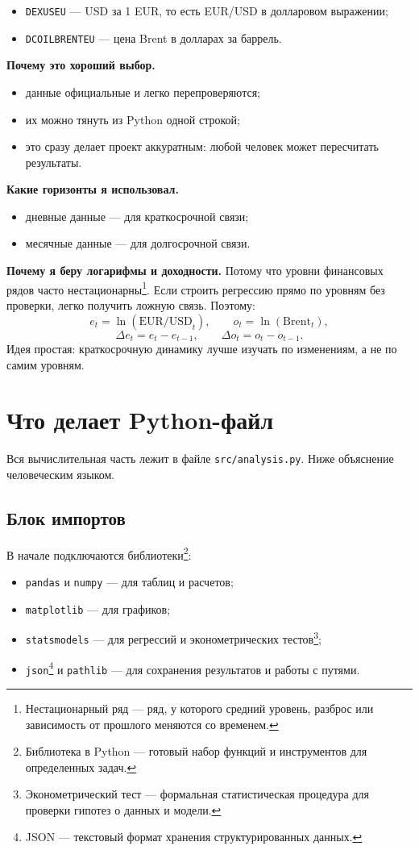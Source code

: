 \documentclass[a4paper,12pt]{article}
\begin{document}
\begin{itemize}
    \item \texttt{DEXUSEU} --- USD за 1 EUR, то есть EUR/USD в долларовом выражении;
    \item \texttt{DCOILBRENTEU} --- цена Brent в долларах за баррель.
\end{itemize}

\textbf{Почему это хороший выбор.}
\begin{itemize}
    \item данные официальные и легко перепроверяются;
    \item их можно тянуть из Python одной строкой;
    \item это сразу делает проект аккуратным: любой человек может пересчитать результаты.
\end{itemize}

\textbf{Какие горизонты я использовал.}
\begin{itemize}
    \item дневные данные --- для краткосрочной связи;
    \item месячные данные --- для долгосрочной связи.
\end{itemize}

\textbf{Почему я беру логарифмы и доходности.}
Потому что уровни финансовых рядов часто нестационарны\footnote{Нестационарный ряд --- ряд, у которого средний уровень, разброс или зависимость от прошлого меняются со временем.}. Если строить регрессию прямо по уровням без проверки, легко получить ложную связь. Поэтому:
\[
e_t=\ln(\text{EUR/USD}_t), \qquad o_t=\ln(\text{Brent}_t),
\]
\[
\Delta e_t=e_t-e_{t-1}, \qquad \Delta o_t=o_t-o_{t-1}.
\]
Идея простая: краткосрочную динамику лучше изучать по изменениям, а не по самим уровням.

\section{Что делает Python-файл}
Вся вычислительная часть лежит в файле \texttt{src/analysis.py}. Ниже объяснение человеческим языком.

\subsection{Блок импортов}
В начале подключаются библиотеки\footnote{Библиотека в Python --- готовый набор функций и инструментов для определенных задач.}:
\begin{itemize}
    \item \texttt{pandas} и \texttt{numpy} --- для таблиц и расчетов;
    \item \texttt{matplotlib} --- для графиков;
    \item \texttt{statsmodels} --- для регрессий и эконометрических тестов\footnote{Эконометрический тест --- формальная статистическая процедура для проверки гипотез о данных и модели.};
    \item \texttt{json}\footnote{JSON --- текстовый формат хранения структурированных данных.} и \texttt{pathlib} --- для сохранения результатов и работы с путями.
\end{itemize}
\end{document}
